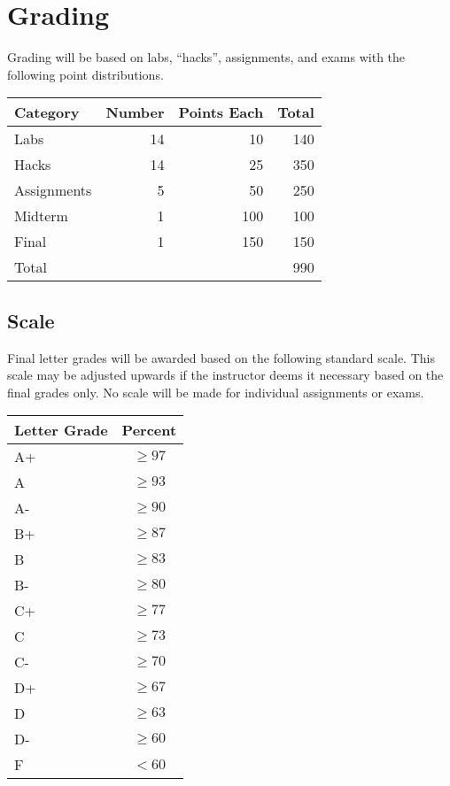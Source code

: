 \documentclass[12pt]{scrartcl}
\begin{document}
\section{Grading}

Grading will be based on labs, ``hacks'', assignments, and exams
with the following point distributions.

\begin{table}[h]
\centering
\begin{tabular}{lrrr}
Category & Number & Points Each & Total \\
\hline\hline
Labs        & 14 & 10 & 140 \\
Hacks       & 14 & 25 & 350 \\
Assignments & 5  & 50 & 250 \\
Midterm     & 1  & 100 & 100 \\
Final       & 1  & 150 & 150 \\
\hline
Total  & & & 990 
\end{tabular}
\end{table}

\subsection{Scale}

Final letter grades will be awarded based on the following 
standard scale. This scale may be adjusted upwards if the 
instructor deems it necessary based on the final grades only.  
No scale will be made for individual assignments or exams.

\begin{table}[h]
\centering
\begin{tabular}{p{1cm}c}
Letter Grade & Percent \\
\hline\hline
A+ & $\geq 97$ \\
A  & $\geq 93$ \\
A- & $\geq 90$ \\
B+ & $\geq 87$ \\
B  & $\geq 83$ \\
B- & $\geq 80$ \\
C+ & $\geq 77$ \\
C  & $\geq 73$ \\
C- & $\geq 70$ \\
D+ & $\geq 67$ \\
D  & $\geq 63$ \\
D- & $\geq 60$ \\
F  & $<60$ \\
\end{tabular}
\end{table}
\end{document}
